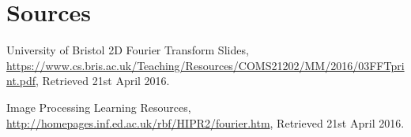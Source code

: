 \documentclass[11pt, a4paper]{article}
\begin{document}
\section{Sources}
\renewcommand{\refname}{\vspace{-2em}}
\begin{thebibliography}{9}

  University of Bristol 2D Fourier Transform Slides,
  \url{https://www.cs.bris.ac.uk/Teaching/Resources/COMS21202/MM/2016/03FFTprint.pdf},
  Retrieved 21st April 2016.
  
  Image Processing Learning Resources,
  \url{http://homepages.inf.ed.ac.uk/rbf/HIPR2/fourier.htm},
  Retrieved 21st April 2016.

\end{thebibliography}
\end{document}
